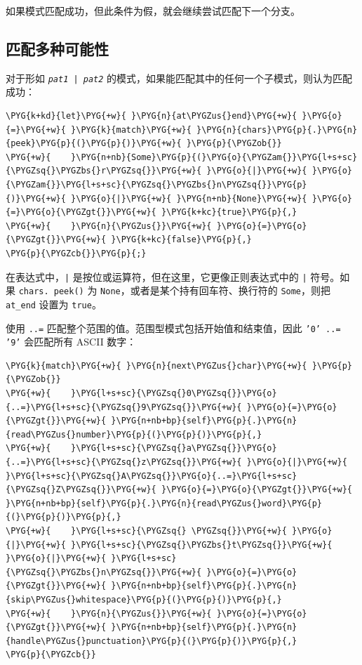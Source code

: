 如果模式匹配成功，但此条件为假，就会继续尝试匹配下一个分支。

\subsection{匹配多种可能性}

对于形如 \texttt{\emph{pat1} | \emph{pat2}} 的模式，如果能匹配其中的任何一个子模式，则认为匹配成功：

\begin{Verbatim}[commandchars=\\\{\},breaklines=true,breakanywhere=true,fontsize=\codefont,xleftmargin=17bp]
\PYG{k+kd}{let}\PYG{+w}{ }\PYG{n}{at\PYGZus{}end}\PYG{+w}{ }\PYG{o}{=}\PYG{+w}{ }\PYG{k}{match}\PYG{+w}{ }\PYG{n}{chars}\PYG{p}{.}\PYG{n}{peek}\PYG{p}{(}\PYG{p}{)}\PYG{+w}{ }\PYG{p}{\PYGZob{}}
\PYG{+w}{    }\PYG{n+nb}{Some}\PYG{p}{(}\PYG{o}{\PYGZam{}}\PYG{l+s+sc}{\PYGZsq{}\PYGZbs{}r\PYGZsq{}}\PYG{+w}{ }\PYG{o}{|}\PYG{+w}{ }\PYG{o}{\PYGZam{}}\PYG{l+s+sc}{\PYGZsq{}\PYGZbs{}n\PYGZsq{}}\PYG{p}{)}\PYG{+w}{ }\PYG{o}{|}\PYG{+w}{ }\PYG{n+nb}{None}\PYG{+w}{ }\PYG{o}{=}\PYG{o}{\PYGZgt{}}\PYG{+w}{ }\PYG{k+kc}{true}\PYG{p}{,}
\PYG{+w}{    }\PYG{n}{\PYGZus{}}\PYG{+w}{ }\PYG{o}{=}\PYG{o}{\PYGZgt{}}\PYG{+w}{ }\PYG{k+kc}{false}\PYG{p}{,}
\PYG{p}{\PYGZcb{}}\PYG{p}{;}
\end{Verbatim}

在表达式中，\texttt{|} 是按位或运算符，但在这里，它更像正则表达式中的 \texttt{|} 符号。如果 \texttt{chars. peek()} 为 \texttt{None}，或者是某个持有回车符、换行符的 \texttt{Some}，则把 \texttt{at\_end} 设置为 \texttt{true}。

使用 \texttt{..=} 匹配整个范围的值。范围型模式包括开始值和结束值，因此 \texttt{'0' ..= '9'} 会匹配所有 ASCII 数字：

\begin{Verbatim}[commandchars=\\\{\},breaklines=true,breakanywhere=true,fontsize=\codefont,xleftmargin=17bp]
\PYG{k}{match}\PYG{+w}{ }\PYG{n}{next\PYGZus{}char}\PYG{+w}{ }\PYG{p}{\PYGZob{}}
\PYG{+w}{    }\PYG{l+s+sc}{\PYGZsq{}0\PYGZsq{}}\PYG{o}{..=}\PYG{l+s+sc}{\PYGZsq{}9\PYGZsq{}}\PYG{+w}{ }\PYG{o}{=}\PYG{o}{\PYGZgt{}}\PYG{+w}{ }\PYG{n+nb+bp}{self}\PYG{p}{.}\PYG{n}{read\PYGZus{}number}\PYG{p}{(}\PYG{p}{)}\PYG{p}{,}
\PYG{+w}{    }\PYG{l+s+sc}{\PYGZsq{}a\PYGZsq{}}\PYG{o}{..=}\PYG{l+s+sc}{\PYGZsq{}z\PYGZsq{}}\PYG{+w}{ }\PYG{o}{|}\PYG{+w}{ }\PYG{l+s+sc}{\PYGZsq{}A\PYGZsq{}}\PYG{o}{..=}\PYG{l+s+sc}{\PYGZsq{}Z\PYGZsq{}}\PYG{+w}{ }\PYG{o}{=}\PYG{o}{\PYGZgt{}}\PYG{+w}{ }\PYG{n+nb+bp}{self}\PYG{p}{.}\PYG{n}{read\PYGZus{}word}\PYG{p}{(}\PYG{p}{)}\PYG{p}{,}
\PYG{+w}{    }\PYG{l+s+sc}{\PYGZsq{} \PYGZsq{}}\PYG{+w}{ }\PYG{o}{|}\PYG{+w}{ }\PYG{l+s+sc}{\PYGZsq{}\PYGZbs{}t\PYGZsq{}}\PYG{+w}{ }\PYG{o}{|}\PYG{+w}{ }\PYG{l+s+sc}{\PYGZsq{}\PYGZbs{}n\PYGZsq{}}\PYG{+w}{ }\PYG{o}{=}\PYG{o}{\PYGZgt{}}\PYG{+w}{ }\PYG{n+nb+bp}{self}\PYG{p}{.}\PYG{n}{skip\PYGZus{}whitespace}\PYG{p}{(}\PYG{p}{)}\PYG{p}{,}
\PYG{+w}{    }\PYG{n}{\PYGZus{}}\PYG{+w}{ }\PYG{o}{=}\PYG{o}{\PYGZgt{}}\PYG{+w}{ }\PYG{n+nb+bp}{self}\PYG{p}{.}\PYG{n}{handle\PYGZus{}punctuation}\PYG{p}{(}\PYG{p}{)}\PYG{p}{,}
\PYG{p}{\PYGZcb{}}
\end{Verbatim}

